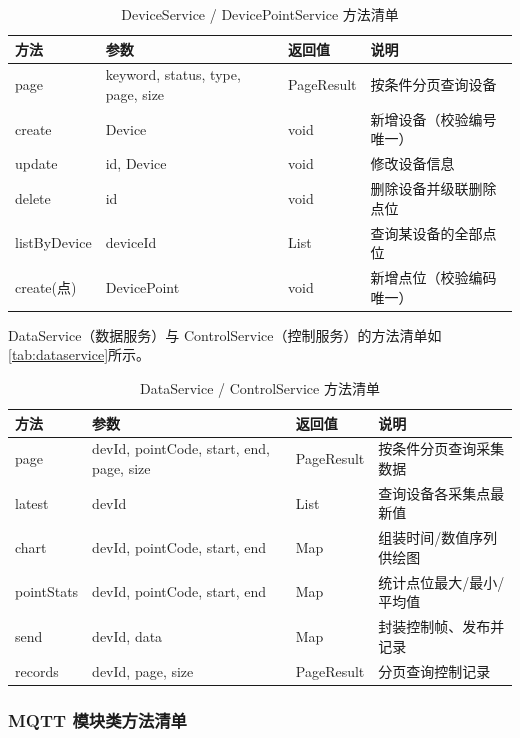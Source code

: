 \documentclass[12pt,hyperref,a4paper,UTF8]{ctexart}
\begin{document}
\begin{table}[!htbp]
    \centering
    \caption{DeviceService / DevicePointService 方法清单}
    \label{tab:deviceservice}
    \begin{tabularx}{0.90\textwidth}{@{}L{3.2cm} L{3.4cm} L{2.3cm} Y@{}}
    \toprule
    \textbf{方法} & \textbf{参数} & \textbf{返回值} & \textbf{说明} \\
    \midrule
    page & keyword, status, type, page, size & PageResult & 按条件分页查询设备 \\
    create & Device & void & 新增设备（校验编号唯一） \\
    update & id, Device & void & 修改设备信息 \\
    delete & id & void & 删除设备并级联删除点位 \\
    listByDevice & deviceId & List & 查询某设备的全部点位 \\
    create(点) & DevicePoint & void & 新增点位（校验编码唯一） \\
    \bottomrule
    \end{tabularx}
\end{table}

DataService（数据服务）与 ControlService（控制服务）的方法清单如\autoref{tab:dataservice}所示。

\begin{table}[!htbp]
    \centering
    \caption{DataService / ControlService 方法清单}
    \label{tab:dataservice}
    \begin{tabularx}{0.90\textwidth}{@{}L{3.2cm} L{3.4cm} L{2.3cm} Y@{}}
    \toprule
    \textbf{方法} & \textbf{参数} & \textbf{返回值} & \textbf{说明} \\
    \midrule
    page & devId, pointCode, start, end, page, size & PageResult & 按条件分页查询采集数据 \\
    latest & devId & List & 查询设备各采集点最新值 \\
    chart & devId, pointCode, start, end & Map & 组装时间/数值序列供绘图 \\
    pointStats & devId, pointCode, start, end & Map & 统计点位最大/最小/平均值 \\
    send & devId, data & Map & 封装控制帧、发布并记录 \\
    records & devId, page, size & PageResult & 分页查询控制记录 \\
    \bottomrule
    \end{tabularx}
\end{table}

\subsubsection{MQTT 模块类方法清单}
\end{document}
